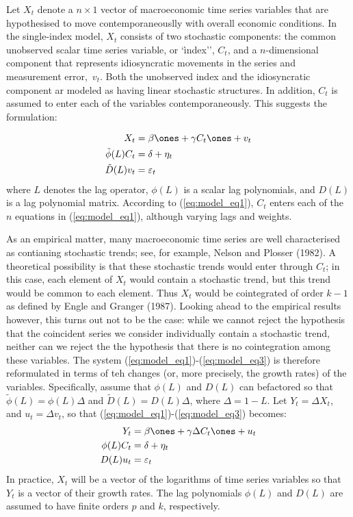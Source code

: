 Let $X_t$ denote a $n\times 1$ vector of macroeconomic time series variables that are hypothesised to move contemporaneouslly with overall economic conditions. In the single-index model, $X_t$ consists of two stochastic components: the common unobserved scalar time series variable, or `ìndex'', $C_t$, and a $n$-dimensional component that represents idiosyncratic movements in the series and measurement error,~$v_t$. Both the unobserved index and the idiosyncratic component ar modeled as having linear stochastic structures. In addition, $C_t$ is assumed to enter each of the variables contemporaneously. This suggests the formulation:

\begin{align}
		X_t &= \beta\ones + \gamma C_t \ones + v_t \label{eq:model_eq1}\\
		\tilde{\phi}(L) C_t &= \delta + \eta_t \\
		\tilde{D}(L) v_t &= \varepsilon_t\label{eq:model_eq3}
	\end{align}
where $L$ denotes the lag operator, $\phi(L)$ is a scalar lag polynomials, and $D(L)$ is a lag polynomial matrix. According to (\ref{eq:model_eq1}), $C_t$ enters each of the $n$ equations in (\ref{eq:model_eq1}), although varying lags and weights.

As an empirical matter, many macroeconomic time series are well characterised as contianing stochastic trends; see, for example, Nelson and Plosser (1982). A theoretical possibility is that these stochastic trends would enter through $C_t$; in this case, each element of $X_t$ would contain a stochastic trend, but this trend would be common to each element. Thus $X_t$ would be cointegrated of order $k-1$ as defined by Engle and Granger (1987). Looking ahead to the empirical results however, this turns out not to be the case: while we cannot reject the hypothesis that the coincident series we consider individually contain a stochastic trend, neither can we reject the the hypothesis that there is no cointegration among these variables. The system (\ref{eq:model_eq1})-(\ref{eq:model_eq3}) is therefore reformulated in terms of teh changes (or, more precisely, the growth rates) of the variables. Specifically, assume that $\phi(L)$ and $D(L)$ can befactored so that $\tilde{\phi}(L) = \phi(L)\Delta$ and $\tilde{D}(L) = D(L) \Delta$, where $\Delta = 1-L$. Let $Y_t = \Delta X_t$, and $u_t = \Delta v_t$, so that (\ref{eq:model_eq1})-(\ref{eq:model_eq3}) becomes:
\begin{align}
	Y_t &= \beta \ones + \gamma \Delta C_t \ones + u_t \label{eq:model_eq4}\\
	\phi(L) C_t &= \delta + \eta_t \label{eq:model_eq5}\\
	D(L) u_t &= \varepsilon_t\label{eq:model_eq6}
\end{align}
In practice, $X_t$ will be a vector of the logarithms of time series variables so that $Y_t$ is a vector of their growth rates. The lag polynomials $\phi(L)$ and $D(L)$ are assumed to have finite orders $p$ and $k$, respectively. 

